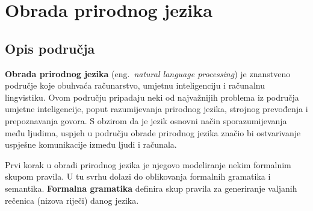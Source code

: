 \documentclass[a4paper,twoside,12pt]{memoir} %
\newcommand{\ti}[1]{\textit{#1\/}}
\newcommand{\tb}{\textbf}
\begin{document}
	\chapter{Obrada prirodnog jezika}

	\section{Opis područja}

	\textbf{Obrada prirodnog jezika} (eng.~\ti{natural language processing}) je znanstveno područje koje obuhvaća računarstvo, umjetnu inteligenciju i računalnu lingvistiku. Ovom području pripadaju neki od najvažnijih problema iz područja umjetne inteligencije, poput razumijevanja prirodnog jezika, strojnog prevođenja i prepoznavanja govora. S obzirom da je jezik osnovni način sporazumijevanja među ljudima, uspjeh u području obrade prirodnog jezika značio bi ostvarivanje uspješne komunikacije između ljudi i računala.

	Prvi korak u obradi prirodnog jezika je njegovo modeliranje nekim formalnim skupom pravila. U tu svrhu dolazi do oblikovanja formalnih gramatika i semantika. \tb{Formalna gramatika} definira skup pravila za generiranje valjanih rečenica (nizova riječi) danog jezika.
\end{document}
